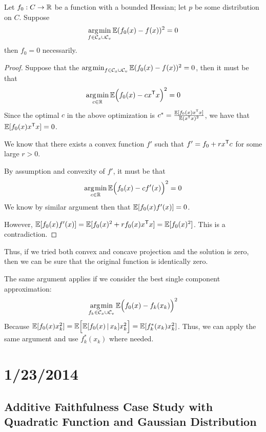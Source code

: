 \documentclass{article}
\begin{document}
{\begin{theorem}
Let $f_0: C \rightarrow \mathbb{R}$ be a function with a bounded Hessian; let $p$ be some distribution on $C$.
Suppose 
\[
\mathop{\rm arg\kern.2ex min}_{f \in \mathcal{C}_x \cup \mathcal{C}_v} 
   \mathbb{E} (f_0(x) - f(x))^2  = 0
\]
 then $f_0 = 0$ necessarily.
\end{theorem}

\begin{proof}

Suppose that the $\mathop{\rm arg\kern.2ex min}_{f \in \mathcal{C}_x \cup \mathcal{C}_v} \mathbb{E}( f_0(x) - f(x))^2 = 0$, then it must be that 
\[
\mathop{\rm arg\kern.2ex min}_{c \in \mathbb{R}} \mathbb{E}\Big( f_0(x) - c x^{\mathsf{T}} x \Big)^2 = 0
\]
Since the optimal $c$ in the above optimization is 
$c^* = \frac{\mathbb{E}[ f_0(x) x^{\mathsf{T}} x ]}{\mathbb{E} (x^{\mathsf{T}} x)^2 }$, 
we have that $\mathbb{E}[ f_0(x) x^{\mathsf{T}} x]=0$.

We know that there exists a convex function $f'$ such that $f' = f_0 + r x^{\mathsf{T}} c$ for some large $r > 0$. 

By assumption and convexity of $f'$, it must be that 
\[
\mathop{\rm arg\kern.2ex min}_{c \in \mathbb{R}} \mathbb{E}\Big( f_0(x) - c f'(x) \Big)^2 = 0
\]
We know by similar argument then that $\mathbb{E}[ f_0(x) f'(x) ] =0$. 

However, $\mathbb{E}[ f_0(x) f'(x) ] = \mathbb{E}[f_0(x)^2 + r f_0(x) x^{\mathsf{T}} x ] = \mathbb{E}[ f_0(x)^2]$. This is a contradiction. 

\end{proof}

Thus, if we tried both convex and concave projection and the solution is zero, then we can be sure that the original function is identically zero.

The same argument applies if we consider the best single component approximation:
\[
\mathop{\rm arg\kern.2ex min}_{f_k \in \mathcal{C}_x \cup \mathcal{C}_v} 
\mathbb{E}\Big( f_0(x) - f_k(x_k) \Big)^2
\]
Because $\mathbb{E}[ f_0(x) x_k^2 ] = \mathbb{E}\Big[ \mathbb{E}[f_0(x) \,|\, x_k] x_k^2\Big] 
= \mathbb{E}[ f^*_k(x_k) x_k^2]$.
Thus, we can apply the same argument and use $f^*_k(x_k)$ where needed.

\newpage

\section{1/23/2014}

\subsection{Additive Faithfulness Case Study with Quadratic Function and Gaussian Distribution}

}
\end{document}
